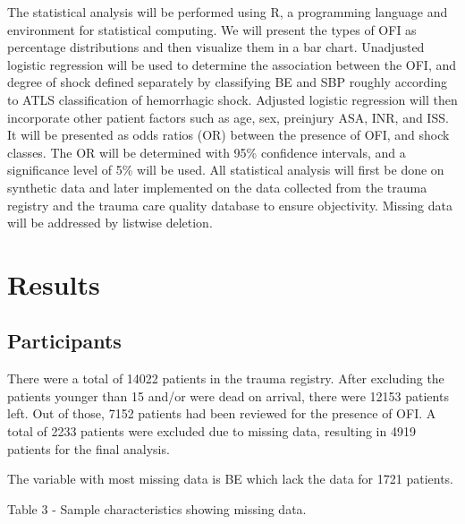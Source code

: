 \documentclass[
]{article}
\begin{document}
The statistical analysis will be performed using R, a programming
language and environment for statistical computing. We will present the
types of OFI as percentage distributions and then visualize them in a
bar chart. Unadjusted logistic regression will be used to determine the
association between the OFI, and degree of shock defined separately by
classifying BE and SBP roughly according to ATLS classification of
hemorrhagic shock. Adjusted logistic regression will then incorporate
other patient factors such as age, sex, preinjury ASA, INR, and ISS. It
will be presented as odds ratios (OR) between the presence of OFI, and
shock classes. The OR will be determined with 95\% confidence intervals,
and a significance level of 5\% will be used. All statistical analysis
will first be done on synthetic data and later implemented on the data
collected from the trauma registry and the trauma care quality database
to ensure objectivity. Missing data will be addressed by listwise
deletion.

\hypertarget{results-1}{%
\section{Results}\label{results-1}}

\hypertarget{participants-1}{%
\subsection{Participants}\label{participants-1}}

There were a total of 14022 patients in the trauma registry. After
excluding the patients younger than 15 and/or were dead on arrival,
there were 12153 patients left. Out of those, 7152 patients had been
reviewed for the presence of OFI. A total of 2233 patients were excluded
due to missing data, resulting in 4919 patients for the final analysis.

The variable with most missing data is BE which lack the data for 1721
patients.

Table 3 - Sample characteristics showing missing data.
\end{document}
